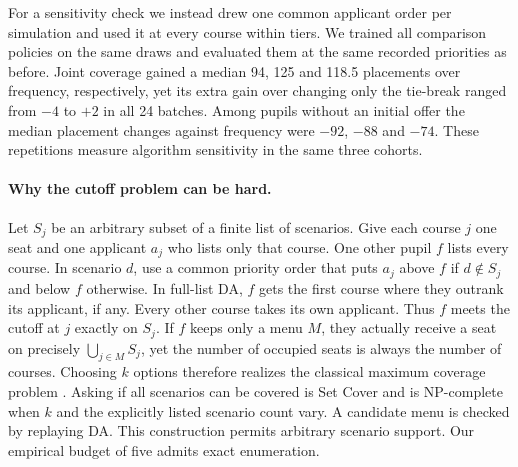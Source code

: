 For a sensitivity check we instead drew one common applicant order per simulation and used it at every course within tiers. We trained all comparison policies on the same draws and evaluated them at the same recorded priorities as before. Joint coverage gained a median 94, 125 and 118.5 placements over frequency, respectively, yet its extra gain over changing only the tie-break ranged from $-4$ to $+2$ in all 24 batches. Among pupils without an initial offer the median placement changes against frequency were $-92$, $-88$ and $-74$. These repetitions measure algorithm sensitivity in the same three cohorts.

\paragraph{Why the cutoff problem can be hard.}
Let $S_j$ be an arbitrary subset of a finite list of scenarios. Give each course $j$ one seat and one applicant $a_j$ who lists only that course. One other pupil $f$ lists every course. In scenario $d$, use a common priority order that puts $a_j$ above $f$ if $d\notin S_j$ and below $f$ otherwise. In full-list DA, $f$ gets the first course where they outrank its applicant, if any. Every other course takes its own applicant. Thus $f$ meets the cutoff at $j$ exactly on $S_j$. If $f$ keeps only a menu $M$, they actually receive a seat on precisely $\bigcup_{j\in M}S_j$, yet the number of occupied seats is always the number of courses. Choosing $k$ options therefore realizes the classical maximum coverage problem \citep{feigecoverage}. Asking if all scenarios can be covered is Set Cover and is NP-complete when $k$ and the explicitly listed scenario count vary. A candidate menu is checked by replaying DA. This construction permits arbitrary scenario support. Our empirical budget of five admits exact enumeration.
